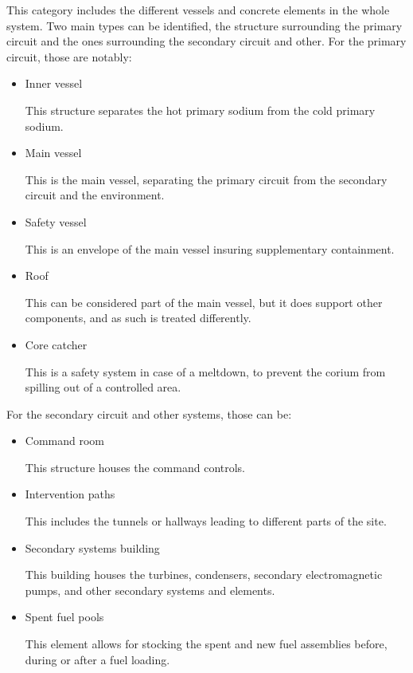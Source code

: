 This category includes the different vessels and concrete elements in the whole system. Two main types can be identified, the structure surrounding the primary circuit and the ones surrounding the secondary circuit and other. For the primary circuit, those are notably:
\begin{itemize}
\item Inner vessel

    This structure separates the hot primary sodium from the cold primary sodium.

\item Main vessel 

    This is the main vessel, separating the primary circuit from the secondary circuit and the environment.

\item Safety vessel

    This is an envelope of the main vessel insuring supplementary containment.

\item Roof

    This can be considered part of the main vessel, but it does support other components, and as such is treated differently.

\item Core catcher

    This is a safety system in case of a meltdown, to prevent the corium from spilling out of a controlled area.
\end{itemize}

For the secondary circuit and other systems, those can be:

\begin{itemize}
\item Command room

    This structure houses the command controls.

\item Intervention paths

    This includes the tunnels or hallways leading to different parts of the site.

\item Secondary systems building

    This building houses the turbines, condensers, secondary electromagnetic pumps, and other secondary systems and elements.

\item Spent fuel pools

    This element allows for stocking the spent and new fuel assemblies before, during or after a fuel loading.
\end{itemize}

